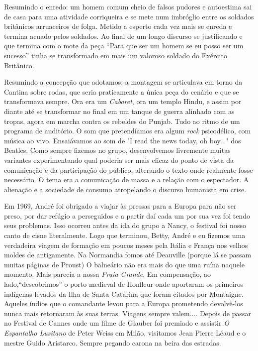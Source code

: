 Resumindo o enredo: um homem comum cheio de falsos pudores e autoestima
sai de casa para uma atividade corriqueira e se mete num imbróglio entre
os soldados britânicos arruaceiros de folga. Metido a esperto cada vez
mais se enreda e termina acuado pelos soldados. Ao final de um longo
discurso se justificando e que termina com o mote da peça “Para que ser
um homem se eu posso ser um sucesso” tinha se transformado em mais um
valoroso soldado do Exército Britânico.

Resumindo a concepção que adotamos: a montagem se articulava em torno da
Cantina sobre rodas, que seria praticamente a única peça do cenário e
que se transformava sempre. Ora era um {\it Cabaret}, ora um templo
Hindu, e assim por diante até se transformar no final em um tanque de
guerra alinhado com as tropas, agora em marcha contra os rebeldes do
Punjab. Tudo ao ritmo de um programa de auditório. O som que
pretendíamos era algum {\it rock} psicodélico, com música ao vivo.
Ensaiávamos ao som de "I read the news today, oh boy..." dos Beatles.
Como sempre fizemos no grupo, desenvolvemos livremente muitas variantes
experimentando qual poderia ser mais eficaz do ponto de vista da
comunicação e da participação do público, alterando o texto onde
realmente fosse necessário. O tema era a comunicação de massa e a
relação com o espectador. A alienação e a sociedade de consumo
atropelando o discurso humanista em crise.

\subject{Repressão política e fim do {\cap tusp}}

Em 1969, André foi obrigado a viajar às pressas para a Europa para não
ser preso, por dar refúgio a perseguidos e a partir daí cada um por sua
vez foi tendo seus problemas. Isso ocorreu antes da ida do grupo a
Nancy, o festival foi nosso canto de cisne literalmente. Logo que
terminou, Betty, André e eu fizemos uma verdadeira viagem de formação em
poucos meses pela Itália e França nos velhos moldes de antigamente. Na
Normandia fomos até Deauville (porque lá se passam muitas páginas de
Proust) O balneário não era mais do que uma ruína naquele momento. Mais
parecia a nossa {\it Praia Grande}. Em compensação, ao
lado,“descobrimos” o porto medieval de Honfleur onde aportaram os
primeiros indígenas levados da Ilha de Santa Catarina que foram citados
por Montaigne. Aqueles índios que o comandante levou para a Europa
prometendo devolvê-los nunca mais retornaram às suas terras. Viagens
sempre valem.... Depois de passar no Festival de Cannes onde um filme de
Glauber foi premiado e assistir {\it O Espantalho Lusitano} de Peter
Weiss em Milão, visitamos Jean Pierre Léaud e o mestre Guido Aristarco.
Sempre pegando carona na beira das estradas.

